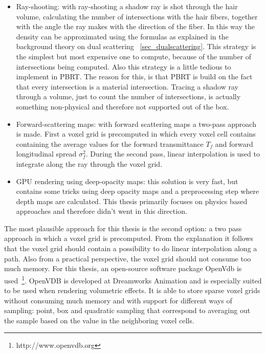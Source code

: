\documentclass[11pt,a4paper]{report}
\begin{document}
\begin{itemize}
    \item Ray-shooting: with ray-shooting a shadow ray is shot through the hair volume, calculating the number of intersections with the hair fibers, together with the angle the ray makes with the direction of the fiber. In this way the density can be approximated using the formulas as explained in the background theory on dual scattering ~\ref{sec_dualscattering}. This strategy is the simplest but most expensive one to compute, because of the number of intersections being computed. Also this strategy is a little tedious to implement in PBRT. The reason for this, is that PBRT is build on the fact that every intersection is a material intersection. Tracing a shadow ray through a volume, just to count the number of intersections, is actually something non-physical and therefore not supported out of the box.
    \item Forward-scattering maps: with forward scattering maps a two-pass approach is made. First a voxel grid is precomputed in which every voxel cell contains containing the average values for the forward transmittance $T_f$ and forward longitudinal spread $\sigma^2_f$. During the second pass, linear interpolation is used to integrate along the ray through the voxel grid.
    \item GPU rendering using deep-opacity maps: this solution is very fast, but contains some tricks using deep opacity maps and a preprocessing step where depth maps are calculated. This thesis primarily focuses on physics based approaches and therefore didn't went in this direction.
\end{itemize}

The most plausible approach for this thesis is the second option: a two pass approach in which a voxel grid is precomputed. From the explanation it follows that the voxel grid should contain a possibility to do linear interpolation along a path. Also from a practical perspective, the voxel grid should not consume too much memory. For this thesis, an open-source software package OpenVdb is used~\footnote{http://www.openvdb.org}. OpenVDB is developed at Dreamworks Animation and is especially suited to be used when rendering volumetric effects. It is able to store sparse voxel grids without consuming much memory and with support for different ways of sampling: point, box and quadratic sampling that correspond to averaging out the sample based on the value in the neighboring voxel cells.
\end{document}
